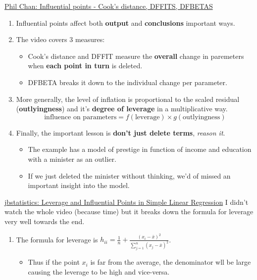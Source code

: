 \documentclass[12pt, titlepage, french]{report}
\begin{document}
\begin{YTB_SUMM}{\href{https://www.youtube.com/watch?v=31xA3hsxW6k}{Phil Chan: Influential points - Cook's distance, DFFITS, DFBETAS}}
\begin{enumerate}
	\item	Influential points affect both \textbf{output} and \textbf{conclusions} important ways.
	\item	The video covers 3 measures:
	\begin{itemize}
		\item	Cook's distance and DFFIT measure the \textbf{overall} change in paremeters when \textbf{each point in turn} is deleted.
		\item	DFBETA breaks it down to the individual change per parameter.
	\end{itemize}
	\item	More generally, the level of inflation is proportional to the scaled residual (\textbf{outlyingness}) and it's \textbf{degree of leverage} in a multiplicative way.
	\begin{equation*}
		\text{influence on parameters} = f(\text{leverage}) \times g(\text{outlyingness})
	\end{equation*}
	\item	Finally, the important lesson is \textbf{don't just delete terms}, \textit{reason it}.
	\begin{itemize}
		\item	The example has a model of prestige in function of income and education with a minister as an outlier. 
		\item	If we just deleted the minister without thinking, we'd of missed an important insight into the model.
	\end{itemize}
\end{enumerate}
\end{YTB_SUMM}

\begin{YTB_SUMM}{\href{https://www.youtube.com/watch?v=xc_X9GFVuVU}{jbstatistics: Leverage and Influential Points in Simple Linear Regression}}
I didn't watch the whole video (because time) but it breaks down the formula for leverage very well towards the end.
\begin{enumerate}
	\item	The formula for leverage is $h_{ii} = \frac{1}{n} + \frac{(x_{i} - \bar{x})^{2}}{\sum_{j = 1}^{n}(x_{j} - \bar{x})^{2}}$.
	\begin{itemize}
		\item	Thus if the point $x_{i}$ is far from the average, the denominator wll be large causing the leverage to be high and vice-versa.
	\end{itemize}
\end{enumerate}
\end{YTB_SUMM}
\end{document}

